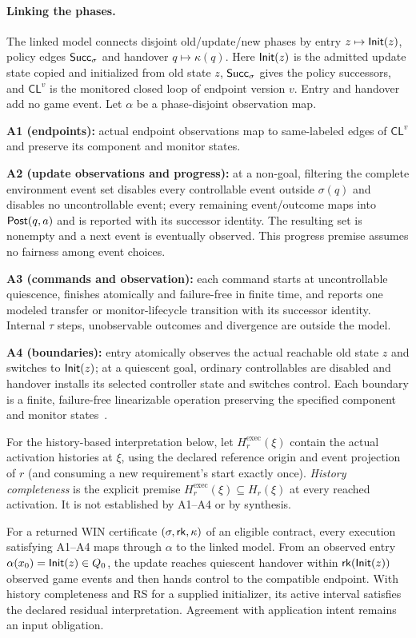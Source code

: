 \paragraph{Linking the phases.}
\label{def:link}
The linked model connects disjoint old/update/new phases by entry $z\mapsto\mathsf{Init}(z)$, policy edges $\mathsf{Succ}_\sigma$ and handover $q\mapsto\kappa(q)$. Here $\mathsf{Init}(z)$ is the admitted update state copied and initialized from old state $z$, $\mathsf{Succ}_\sigma$ gives the policy successors, and $\mathsf{CL}^v$ is the monitored closed loop of endpoint version $v$. Entry and handover add no game event. Let $\alpha$ be a phase-disjoint observation map.

\noindent\textbf{A1 (endpoints):} actual endpoint observations map to same-labeled edges of $\mathsf{CL}^v$ and preserve its component and monitor states.
\par\noindent\textbf{A2 (update observations and progress):} at a non-goal, filtering the complete environment event set disables every controllable event outside $\sigma(q)$ and disables no uncontrollable event; every remaining event/outcome maps into $\mathsf{Post}(q,a)$ and is reported with its successor identity. The resulting set is nonempty and a next event is eventually observed. This progress premise assumes no fairness among event choices.
\par\noindent\textbf{A3 (commands and observation):} each command starts at uncontrollable quiescence, finishes atomically and failure-free in finite time, and reports one modeled transfer or monitor-lifecycle transition with its successor identity. Internal $\tau$ steps, unobservable outcomes and divergence are outside the model.
\par\noindent\textbf{A4 (boundaries):} entry atomically observes the actual reachable old state $z$ and switches to $\mathsf{Init}(z)$; at a quiescent goal, ordinary controllables are disabled and handover installs its selected controller state and switches control. Each boundary is a finite, failure-free linearizable operation preserving the specified component and monitor states~\cite{HerlihyWing1990}.

For the history-based interpretation below, let $H_r^{\mathrm{exec}}(\xi)$ contain the actual activation histories at $\xi$, using the declared reference origin and event projection of $r$ (and consuming a new requirement's start exactly once). \emph{History completeness} is the explicit premise $H_r^{\mathrm{exec}}(\xi)\subseteq H_r(\xi)$ at every reached activation. It is not established by A1--A4 or by synthesis.

\begin{theorem}
\label{thm:realization}
For a returned WIN certificate $(\sigma,\mathsf{rk},\kappa)$ of an eligible contract, every execution satisfying A1--A4 maps through $\alpha$ to the linked model. From an observed entry $\alpha(x_0)=\mathsf{Init}(z)\in Q_0$, the update reaches quiescent handover within $\mathsf{rk}(\mathsf{Init}(z))$ observed game events and then hands control to the compatible endpoint. With history completeness and RS for a supplied initializer, its active interval satisfies the declared residual interpretation. Agreement with application intent remains an input obligation.
\end{theorem}

